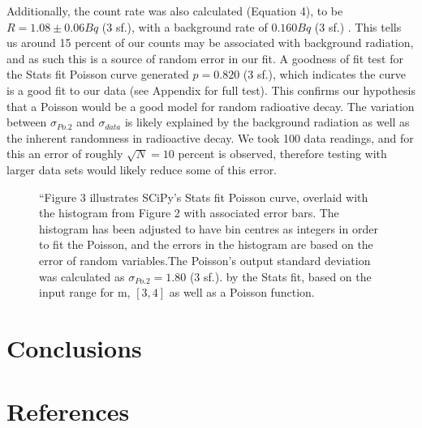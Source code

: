 \documentclass[11pt]{article}
\begin{document}
Additionally, the count rate was also calculated (Equation 4), to be $R = 1.08 \pm 0.06  Bq$ (3 sf.), with a background rate of $0.160 Bq$ (3 sf.) . This tells us around 15 percent of our counts may be associated with background radiation, and as such this is a source of random error in our fit.
A goodness of fit test for the Stats fit Poisson curve generated $p = 0.820$ (3 sf.), which indicates the curve is a good fit to our data (see Appendix for full test). This confirms our hypothesis that a Poisson would be a good model for random radioative decay. 
The variation between $\sigma_{Po.2}$ and $\sigma_{data}$ is likely explained by the background radiation as well as the inherent randomness in radioactive decay. We took 100 data readings, and for this an error of roughly $\sqrt{N} = 10$ percent is observed, therefore testing with larger data sets would likely reduce some of this error.  
       \begin{figure}[]
        \begin{center}
            \def\svgwidth{\columnwidth}
            
             \caption{“Figure 3 illustrates SCiPy's Stats fit Poisson curve, overlaid with the histogram from Figure 2 with associated error bars. The histogram has been adjusted to have bin centres as integers in order to fit the Poisson, and the errors in the histogram are based on the error of random variables.The Poisson's output standard deviation was calculated as $\sigma_{Po.2} = 1.80$ (3 sf.). by the Stats fit,  based on the input range for m, $[3,4]$ as well as a Poisson function.}
             \label{fig:experimental results 2}
        \end{center}
    \end{figure}
    \section{Conclusions}
    \section{References}
\end{document}
